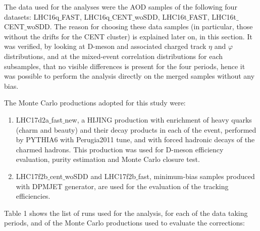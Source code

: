The data used for the analyses were the AOD samples of the following four datasets: LHC16q$\_$FAST, LHC16q$\_$CENT$\_$woSDD, LHC16t$\_$FAST, LHC16t$\_$CENT$\_$woSDD. The reason for choosing these data samples (in particular, those without the drifts for the CENT cluster) is explained later on, in this section. It was verified, by looking at D-meson and associated charged track $\eta$ and $\varphi$ distributions, and at the mixed-event correlation distributions for each subsamples, that no visible differences is present for the four periods, hence it was possible to perform the analysis directly on the merged samples without any bias.

The Monte Carlo productions adopted for this study were:
 \begin{enumerate}
 \item LHC17d2a$\_$fast$\_$new, a HIJING production with enrichment of heavy quarks (charm and beauty) and their decay products in each of the event, performed by PYTHIA6 with Perugia2011 tune, and with forced hadronic decays of the charmed hadrons. This production was used for D-meson efficiency evaluation, purity estimation and Monte Carlo closure test.
 \item LHC17f2b$\_$cent$\_$woSDD and LHC17f2b$\_$fast, minimum-bias samples produced with DPMJET generator, are used for the evaluation of the tracking efficiencies.
\end{enumerate}

Table 1 shows the list of runs used for the analysis, for each of the data taking periods, and of the Monte Carlo productions used to evaluate the corrections:

